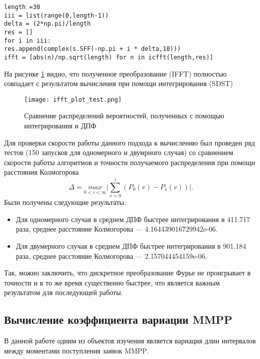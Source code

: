 \begin{lstlisting}
length =30
iii = list(range(0,length-1))
delta = (2*np.pi)/length
res = []
for i in iii:
res.append(complex(s.SFF(-np.pi + i * delta,10)))
ifft = [abs(n)/np.sqrt(length) for n in icfft(length,res)]
\end{lstlisting}
На рисунке \ref{ifft_plot_test} видно, что полученное преобразование (IFFT) полностью совпадает с результатом вычисления при помощи интегрирования (SDST)
\begin{figure}[H]
	\centering
	\texttt{[image: ifft\_plot\_test.png]}
	\caption{Сравнение распределений вероятностей, полученных с помощью интегрирования и ДПФ}
	\label{ifft_plot_test}
\end{figure}
Для проверки скорости работы данного подхода к вычислению был проведен ряд тестов (150 запусков для одномерного и двумрного случая) со сравнением скорости работы алгоритмов и точности получаемого распределения при помощи расстояния Колмогорова
\begin{equation*}
	\Delta = \underset{0 < i < \infty}{max}\bigg\rvert \sum_{v=0}^{i} (P_0(v) - P_1(v))\bigg\rvert.
\end{equation*}
Были получены следующие результаты:
\begin{itemize}
	\item Для одномерного случая в среднем ДПФ быстрее интегрирования в 411.717 раза, среднее расстояние Колмогорова --- 4.164439016729942e-06.
	\item Для двумерного случая в среднем ДПФ быстрее интегрирования в 901.184 раза, среднее расстояние Колмогорова --- 2.157044454159e-06.
\end{itemize}
Так, можно заключить, что дискретное преобразование Фурье не проигрывает в точности и в то же время существенно быстрее, что является важным результатом для последующей работы.
\subsection{Вычисление коэффициента вариации MMPP}
В данной работе одним из объектов изучения является вариация длин интервалов между моментами поступления заявок MMPP.


